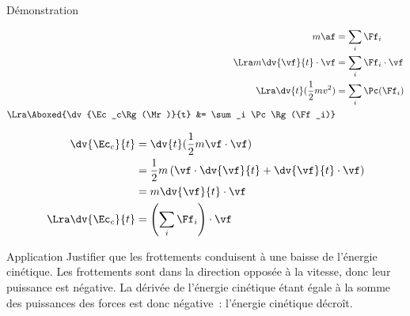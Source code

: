 \documentclass[../main/main.tex]{subfiles}
\begin{document}
\begin{rdemoside}{Démonstration}
    \begin{center}
    \end{center}
    \vspace*{-15pt}
    \begin{align*}
        m\af &= \sum_i \Ff_i
        \\\Lra
        m \dv{\vf}{t}\cdot\vf &= \sum_i \Ff_i\cdot\vf
        \\\Lra
        \dv{t}(\frac{1}{2}mv^2) &= \sum_i \Pc(\Ff_i)
        \\\Lra
        \Aboxed{\dv{\Ec_c\Rg(\Mr)}{t} &= \sum_i \Pc\Rg(\Ff_i)}
    \end{align*}
    \tcblower
    \begin{center}
    \end{center}
    \vspace*{-15pt}
    \begin{align*}
        \dv{\Ec_c}{t} &= \dv{t}(\frac{1}{2}m\vf\cdot\vf)
        \\
                      &= \frac{1}{2}m \left( \vf\cdot \dv{\vf}{t} + \dv{\vf}{t}
                      \cdot \vf\right)
        \\
                      &= m\dv{\vf}{t}\cdot\vf
        \\\Lra
        \dv{\Ec_c}{t} &= \left( \sum_i \Ff_i \right)\cdot\vf
    \end{align*}
\end{rdemoside}


\begin{rexem}{Application}
    Justifier que les frottements conduisent à une baisse de l'énergie
    cinétique.
    \tcblower
    Les frottements sont dans la direction opposée à la vitesse, donc leur
    puissance est négative. La dérivée de l'énergie cinétique étant égale à la
    somme des puissances des forces est donc négative~: l'énergie cinétique
    décroît.
\end{rexem}
\end{document}
